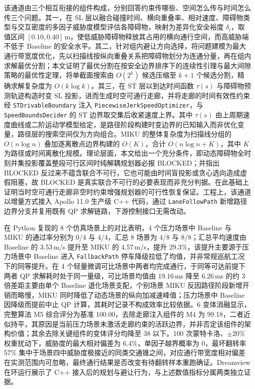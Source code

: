\documentclass[a4paper,11pt]{ctexart}
\theoremstyle{definition}
\begin{document}
该通道由三个相互衔接的组件构成，分别回答约束传哪些、空间怎么传与时间怎么传三个问题。其一，在 SL 层以融合碰撞时间、横向重叠率、相对速度、障碍物类型与交互密度的多因子威胁度模型评估各障碍物，映射为差异化安全裕度 $\delta_i$，取值区间 $[0.10, 0.40]$\,m，使低威胁障碍物释放其占用的横向通行空间，而高威胁端不低于 Baseline 的安全水平。其二，针对组内避让方向选择，将问题建模为最大通行带宽度优化，先以扫描线按纵向重叠关系把障碍物划分为连通分量，再在组内求解最优分割；本文证明了最优分割在按安全边界排序下的连续性引理与最大间隙策略的最优性定理，将单截面搜索由 $O(2^k)$ 候选压缩至 $k+1$ 个候选分割，精确求解复杂度为 $O(k\log k)$。其三，在 ST 层以到达时间函数 $\tau(s)$ 与障碍物预测轨迹构造时变 SL 投影，进而生成时空可通行走廊，并将走廊的时间有效性约束经 \texttt{STDrivableBoundary} 注入 \texttt{PiecewiseJerkSpeedOptimizer}，与 \texttt{SpeedBoundsDecider} 的 ST 边界取交集后收紧速度上界。其中 $\tau(s)$ 由上周期速度曲线或二阶运动学模型给定，是路径阶段构建时变边界的已知输入而非优化变量，路径层的搜索空间仅为方向组合。MIKU 的整体复杂度为扫描线分组的 $O(n\log n)$ 叠加逐离散点边界构建的 $O(K)$，合计 $O(n\log n + K)$，其中 $K$ 为路径或时间离散化规模。理论层面，本文给出一个充分条件，即动态障碍物全时刻并集投影覆盖整段可行区间时纯解耦规划器必报 BLOCKED；并指出 BLOCKED 反过来不蕴含联合不可行，它也可能由时间盲投影或贪心选向造成虚假阻塞，故 BLOCKED 是真实联合不可行的必要表现而非充分判据。在此基础上证明当时空可通行走廊非空时约束增强规划器的可行性恢复保证。工程上，该通道以增量方式接入 Apollo 11.0 生产级 C++ 代码，通过 \texttt{LaneFollowPath} 新增路径边界分支并复用既有 QP 求解链路，下游控制接口无需改动。

在 Python 复现的 8 个仿真场景上的对比表明，4 个压力场景中 Baseline 与 MIKU 的通过率分别为 0/4 与 4/4，汇总 8 场景为 4/8 与 8/8；汇总平均速度由 Baseline 的 3.53\,m/s 提升至 MIKU 的 4.57\,m/s，提升 29.3\%，该提升主要源于压力场景中 Baseline 进入 \texttt{FallbackPath} 停车降级拉低了均值，并非常规巡航工况下的同等提升。在 4 个轻量微调可比场景中两者均完成通行，于同等可达前提下两者 QP 求解耗时处于同一量级，可比场景均值由 19.16\,ms 降至 6.26\,ms 的约 3 倍差距主要由单个 Baseline 退化场景支配，个别场景 MIKU 反因路径阶段新增开销而略慢，MIKU 同时降低了动态场景的纵向加减速峰值；压力场景中 Baseline 因降级而提前中止 QP 计算，其耗时记录不构成效率比较依据。6 变体消融显示，完整算法 M5 综合评分为基准 100.00，去除走廊注入组件的 M4 为 99.18，二者近似持平，其原因是当前压力场景未激活走廊约束的活跃边界，并非否定该组件的架构价值；其余去除关键组件的变体评分均降至 38 以下。100 次蒙特卡洛、$\pm20\%$ 权重扰动下，威胁度的最大相对偏差为 6.4\%，单因子越界概率为 0，最坏翻转率 57\% 集中于场景四中威胁度极接近的同类交通锥之间，对应通行带宽度相对偏差在实测范围内可忽略，最终通行结果是否改变有待翻转样本重跑确证。Dreamview 在环运行展示了 C++ 接入后的规划与避让行为，与上述数值指标分属两类独立证据。
\end{document}
